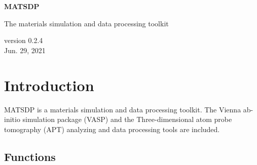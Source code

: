\documentclass[12pt]{book}
\begin{document}

\begin{titlepage}
\begin{center}
\vspace*{1cm}

\Huge
\textbf{MATSDP}

\vspace{0.5cm}
\LARGE The materials simulation and data processing toolkit
\vspace{1.5cm}

\vfill

\vspace{0.8cm}

\small version 0.2.4\\
\small Jun. 29, 2021

\end{center}
\end{titlepage}

\tableofcontents

\chapter{Introduction}
MATSDP is a materials simulation and data processing toolkit. The Vienna ab-initio simulation package (VASP) and the Three-dimensional atom probe tomography (APT) analyzing and data processing tools are included. 

\section{Functions}
\end{document}
